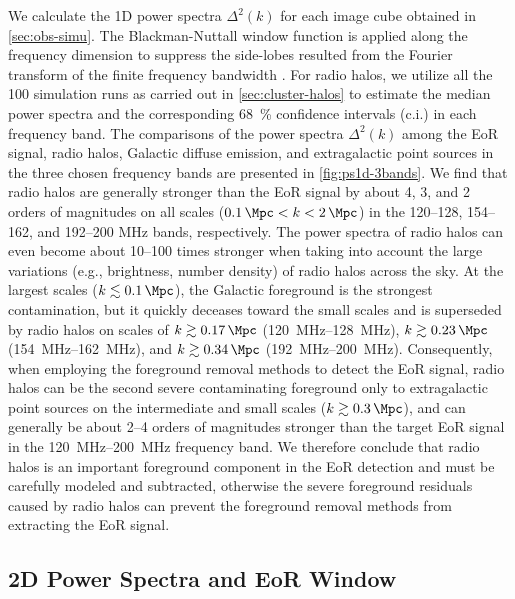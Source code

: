 \documentclass[modern]{aastex62}
\begin{document}
{\color{cyan}%
We calculate the 1D power spectra $\Delta^2(k)$ for each
image cube obtained in \autoref{sec:obs-simu}.
The Blackman-Nuttall window function is applied along the frequency
dimension to suppress the side-lobes resulted from the Fourier transform
of the finite frequency bandwidth \citep[e.g.,][]{trott2015,chapman2016}.
For radio halos, we utilize all the 100 simulation runs as carried out
in \autoref{sec:cluster-halos} to estimate the median power spectra and
the corresponding \SI{68}{\percent} confidence intervals (c.i.) in each
frequency band.
The comparisons of the power spectra $\Delta^2(k)$ among the EoR signal,
radio halos, Galactic diffuse emission, and extragalactic point sources
in the three chosen frequency bands are presented in
\autoref{fig:ps1d-3bands}.
We find that radio halos are generally stronger than the EoR signal by
about 4, 3, and 2 orders of magnitudes on all scales
($\SI{0.1}{\per\Mpc} < k < \SI{2}{\per\Mpc}$) in the \numrange{120}{128},
\numrange{154}{162}, and \numrange{192}{200} \si{\MHz} bands, respectively.
The power spectra of radio halos can even become about \numrange{10}{100}
times stronger when taking into account the large variations (e.g.,
brightness, number density) of radio halos across the sky.
At the largest scales ($k \lesssim \SI{0.1}{\per\Mpc}$), the Galactic
foreground is the strongest contamination, but it quickly deceases
toward the small scales and is superseded by radio halos on scales of
$k \gtrsim \SI{0.17}{\per\Mpc}$ (\SIrange{120}{128}{\MHz}),
$k \gtrsim \SI{0.23}{\per\Mpc}$ (\SIrange{154}{162}{\MHz}), and
$k \gtrsim \SI{0.34}{\per\Mpc}$ (\SIrange{192}{200}{\MHz}).
Consequently, when employing the foreground removal methods to detect
the EoR signal, radio halos can be the second severe contaminating
foreground only to extragalactic point sources on the intermediate and
small scales ($k \gtrsim \SI{0.3}{\per\Mpc}$), and can generally be
about \numrange{2}{4} orders of magnitudes stronger than the target
EoR signal in the \SIrange{120}{200}{\MHz} frequency band.
We therefore conclude that radio halos is an important foreground
component in the EoR detection and must be carefully modeled and
subtracted, otherwise the severe foreground residuals caused by radio
halos can prevent the foreground removal methods from extracting the
EoR signal.
} %

\subsection{2D Power Spectra and EoR Window}
\label{sec:ps2d}
\end{document}
